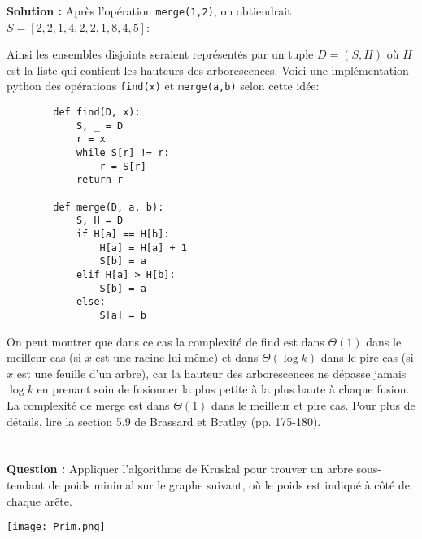 \documentclass[11pt]{article} %
\newenvironment{question}[1][\unskip]{%
	\par
	\noindent
	\textbf{Question #1:}
	\noindent}
{\medskip}
\newenvironment{solution}[1][\unskip]{%
	\par
	\noindent
	\textbf{Solution #1:}
	\noindent}
{\medskip}
\begin{document}
\begin{solution}
		Après l'opération \verb|merge(1,2)|, on obtiendrait $S=[2,2,1,4,2,2,1,8,4,5]$:
		
		
		Ainsi les ensembles disjoints seraient représentés par un tuple $D=(S,H)$ où $H$ est la liste qui contient les hauteurs des arborescences. Voici une implémentation python des opérations \verb|find(x)| et \verb|merge(a,b)| selon cette idée:
		
		\begin{lstlisting}
		def find(D, x):
			S, _ = D
			r = x
			while S[r] != r:
				r = S[r]
			return r
		
		def merge(D, a, b):
			S, H = D
			if H[a] == H[b]:
				H[a] = H[a] + 1
				S[b] = a
			elif H[a] > H[b]:
				S[b] = a
			else:
				S[a] = b
		\end{lstlisting}
		On peut montrer que dans ce cas la complexité de find est dans $\Theta(1)$ dans le meilleur cas (si $x$ est une racine lui-même) et dans $\Theta(\log k)$ dans le pire cas (si $x$ est une feuille d'un arbre), car la hauteur des arborescences ne dépasse jamais $\log k$ en prenant soin de fusionner la plus petite à la plus haute à chaque fusion. La complexité de merge est dans $\Theta(1)$ dans le meilleur et pire cas. Pour plus de détails, lire la section 5.9 de Brassard et Bratley (pp. 175-180).
	\end{solution}
	
	\section{}
	\begin{question}
		Appliquer l'algorithme de Kruskal pour trouver un arbre sous-tendant de poids minimal sur le graphe suivant, où le poids est indiqué à côté de chaque arête.
		\begin{center}
			\texttt{[image: Prim.png]}
		\end{center}
	\end{question}
	
\end{document}
